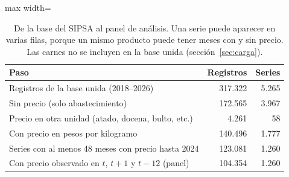 \begin{table}[htbp]\centering\small
\caption{De la base del SIPSA al panel de análisis. Una serie puede aparecer en varias filas, porque un mismo producto puede tener meses con y sin precio. Las carnes no se incluyen en la base unida (sección~\ref{sec:carga}).}\label{tab:embudo}
\begin{adjustbox}{max width=\textwidth}\begin{tabular}{lrr}\toprule
Paso & Registros & Series\\ \midrule
Registros de la base unida (2018--2026) & 317.322 & 5.265 \\
\quad Sin precio (solo abastecimiento) & 172.565 & 3.967 \\
\quad Precio en otra unidad (atado, docena, bulto, etc.) & 4.261 & 58 \\
Con precio en pesos por kilogramo & 140.496 & 1.777 \\
Series con al menos 48 meses con precio hasta 2024 & 123.081 & 1.260 \\
Con precio observado en $t$, $t+1$ y $t-12$ (panel) & 104.354 & 1.260 \\
\bottomrule\end{tabular}\end{adjustbox}\end{table}
